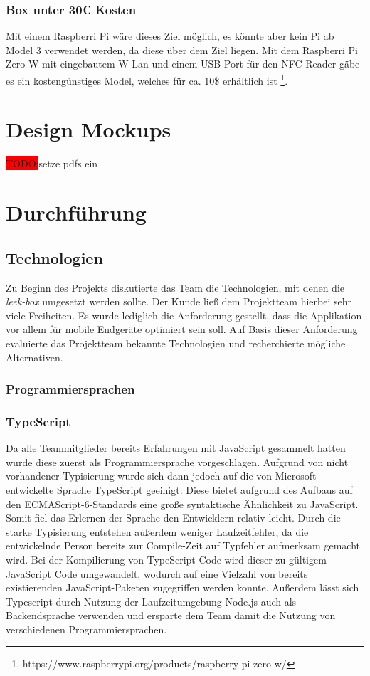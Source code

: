 \documentclass[10pt, a4paper]{article}
\begin{document}
\subsubsection{Box unter 30€ Kosten}
Mit einem Raspberri Pi wäre dieses Ziel möglich, es könnte aber kein Pi ab Model 3 verwendet werden, da diese über dem Ziel liegen.
Mit dem Raspberri Pi Zero W mit eingebautem W-Lan und einem USB Port für den NFC-Reader gäbe es ein kostengünstiges Model, welches für ca. 10\$ erhältlich ist \footnote{https://www.raspberrypi.org/products/raspberry-pi-zero-w/}.

\section{Design Mockups}
\colorbox{red}{TODO:}setze pdfs ein

\section{Durchführung}

\subsection{Technologien}
Zu Beginn des Projekts diskutierte das Team die Technologien, mit denen die \textit{leek-box} umgesetzt werden sollte.
Der Kunde ließ dem Projektteam hierbei sehr viele Freiheiten.
Es wurde lediglich die Anforderung gestellt, dass die Applikation vor allem für mobile Endgeräte optimiert sein soll.
Auf Basis dieser Anforderung evaluierte das Projektteam bekannte Technologien und recherchierte mögliche Alternativen.

\subsubsection{Programmiersprachen}

\subsubsection*{TypeScript}
Da alle Teammitglieder bereits Erfahrungen mit JavaScript gesammelt hatten wurde diese zuerst als Programmiersprache vorgeschlagen.
Aufgrund von nicht vorhandener Typisierung wurde sich dann jedoch auf die von Microsoft entwickelte Sprache TypeScript geeinigt. Diese bietet aufgrund des
Aufbaus auf den ECMAScript-6-Standards eine große syntaktische Ähnlichkeit zu JavaScript. Somit fiel das Erlernen der Sprache den Entwicklern relativ leicht.
Durch die starke Typisierung entstehen außerdem weniger Laufzeitfehler, da die entwickelnde Person bereits zur Compile-Zeit auf Typfehler aufmerksam gemacht wird.\cite{Typescript_Typisierung}
Bei der Kompilierung von TypeScript-Code wird dieser zu gültigem JavaScript Code umgewandelt, wodurch auf eine Vielzahl von bereits existierenden JavaScript-Paketen zugegriffen werden konnte.
Außerdem lässt sich Typescript durch Nutzung der Laufzeitumgebung Node.js auch als Backendsprache verwenden und ersparte dem Team damit die Nutzung von verschiedenen Programmiersprachen.
\end{document}
